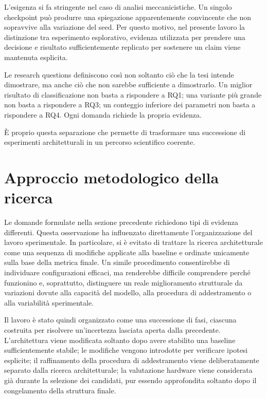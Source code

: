L'esigenza si fa stringente nel caso di analisi meccanicistiche. Un singolo checkpoint può produrre una spiegazione apparentemente convincente che non sopravvive alla variazione del seed. Per questo motivo, nel presente lavoro la distinzione tra esperimento esplorativo, evidenza utilizzata per prendere una decisione e risultato sufficientemente replicato per sostenere un claim viene mantenuta esplicita.

Le research questions definiscono così non soltanto ciò che la tesi intende dimostrare, ma anche ciò che non sarebbe sufficiente a dimostrarlo. Un miglior risultato di classificazione non basta a rispondere a RQ1; una variante più grande non basta a rispondere a RQ3; un conteggio inferiore dei parametri non basta a rispondere a RQ4. Ogni domanda richiede la propria evidenza.

È proprio questa separazione che permette di trasformare una successione di esperimenti architetturali in un percorso scientifico coerente.




\section{Approccio metodologico della ricerca}
\label{sec:approccio_metodologico}

Le domande formulate nella sezione precedente richiedono tipi di evidenza differenti. Questa osservazione ha influenzato direttamente l'organizzazione del lavoro sperimentale. In particolare, si è evitato di trattare la ricerca architetturale come una sequenza di modifiche applicate alla baseline e ordinate unicamente sulla base della metrica finale. Un simile procedimento consentirebbe di individuare configurazioni efficaci, ma renderebbe difficile comprendere perché funzionino e, soprattutto, distinguere un reale miglioramento strutturale da variazioni dovute alla capacità del modello, alla procedura di addestramento o alla variabilità sperimentale.

Il lavoro è stato quindi organizzato come una successione di fasi, ciascuna costruita per risolvere un'incertezza lasciata aperta dalla precedente. L'architettura viene modificata soltanto dopo avere stabilito una baseline sufficientemente stabile; le modifiche vengono introdotte per verificare ipotesi esplicite; il raffinamento della procedura di addestramento viene deliberatamente separato dalla ricerca architetturale; la valutazione hardware viene considerata già durante la selezione dei candidati, pur essendo approfondita soltanto dopo il congelamento della struttura finale.

